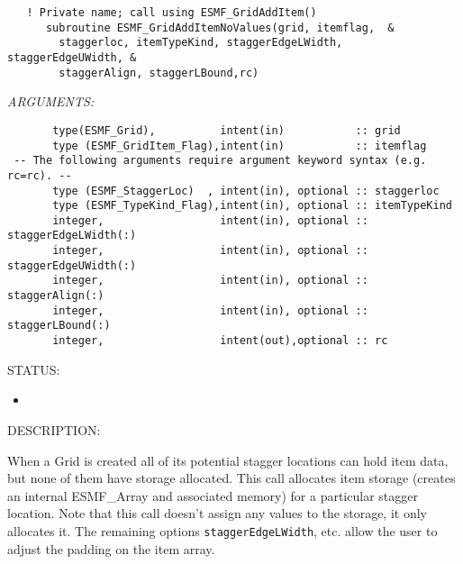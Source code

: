  
\begin{verbatim}   ! Private name; call using ESMF_GridAddItem()
      subroutine ESMF_GridAddItemNoValues(grid, itemflag,  &
        staggerloc, itemTypeKind, staggerEdgeLWidth, staggerEdgeUWidth, &
        staggerAlign, staggerLBound,rc)\end{verbatim}{\em ARGUMENTS:}
\begin{verbatim}       type(ESMF_Grid),          intent(in)           :: grid
       type (ESMF_GridItem_Flag),intent(in)           :: itemflag
 -- The following arguments require argument keyword syntax (e.g. rc=rc). --
       type (ESMF_StaggerLoc)  , intent(in), optional :: staggerloc
       type (ESMF_TypeKind_Flag),intent(in), optional :: itemTypeKind
       integer,                  intent(in), optional :: staggerEdgeLWidth(:)
       integer,                  intent(in), optional :: staggerEdgeUWidth(:)
       integer,                  intent(in), optional :: staggerAlign(:)
       integer,                  intent(in), optional :: staggerLBound(:)
       integer,                  intent(out),optional :: rc\end{verbatim}
{\sf STATUS:}
   \begin{itemize}
   \item{}
   \end{itemize}
  
{\sf DESCRIPTION:\\ }


  
    When a Grid is created all of its potential stagger locations can hold item
    data, but none of them have storage allocated. This call allocates item
    storage (creates an internal ESMF\_Array and associated memory) for  a particular
    stagger location. Note that this
    call doesn't assign any values to the storage, it only allocates it. The
    remaining options {\tt staggerEdgeLWidth}, etc. allow the user to adjust the
    padding on the item array.
  
